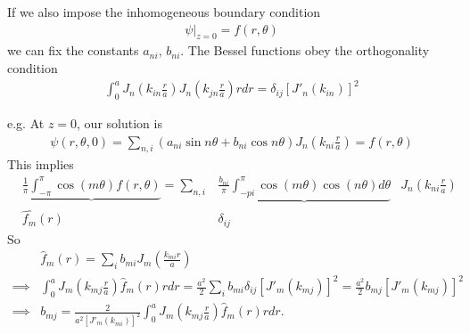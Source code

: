 \documentclass[a4paper]{article}
\begin{document}
If we also impose the inhomogeneous boundary condition
\begin{equation*}
\begin{aligned}
\psi|_{z=0} = f\left(r,\theta\right)
\end{aligned}
\end{equation*}
we can fix the constants $a_{ni}$, $b_{ni}$. The Bessel functions obey the orthogonality condition
\begin{equation*}
\begin{aligned}
\int_0^a J_n\left(k_{in}\frac{r}{a}\right)J_n\left(k_{jn}\frac{r}{a}\right) r dr = \delta_{ij}\left[J'_n\left(k_{in}\right)\right]^2
\end{aligned}
\end{equation*}

e.g. At $z=0$, our solution is 
\begin{equation*}
\begin{aligned}
\psi\left(r,\theta,0\right) = \sum_{n,i}\left(a_{ni} \sin n\theta + b_{ni} \cos n\theta\right) J_n \left(k_{ni} \frac{r}{a}\right) = f\left(r,\theta\right)
\end{aligned}
\end{equation*}
This implies
\begin{equation*}
\begin{aligned}
&\underbrace{\frac{1}{\pi}\int_{-\pi}^\pi \cos  \left(m\theta\right) f\left(r,\theta\right)} = \sum_{n,i} &\underbrace{\frac{b_{ni}}{\pi} \int_{-pi}^\pi \cos \left(m\theta\right) \cos\left(n\theta\right) d\theta}& J_n \left(k_{ni} \frac{r}{a}\right)\\
&\hat{f_m}\left(r\right) &\delta_{ij}&
\end{aligned}
\end{equation*}
So
\begin{equation*}
\begin{aligned}
&\hat{f}_m\left(r\right) = \sum_i b_{mi}J_m \left(\frac{k_{mi} r}{a}\right)\\
\implies &\int_0^a J_m\left(k_{mj} \frac{r}{a}\right) \hat{f}_m\left(r\right) rdr = \frac{a^2}{2} \sum_i b_{mi}\delta_{ij} \left[J'_m \left(k_{mj} \right)\right]^2 = \frac{a^2}{2}b_{mj} \left[J'_m\left(k_{mj}\right)\right]^2\\
\implies & b_{mj} = \frac{2}{a^2 \left[J'_m \left(k_{mi}\right)\right]^2} \int_0^a J_m\left(k_{mj}\frac{r}{a}\right) \hat{f}_m \left(r\right) r dr.
\end{aligned}
\end{equation*}

\newpage
\end{document}
